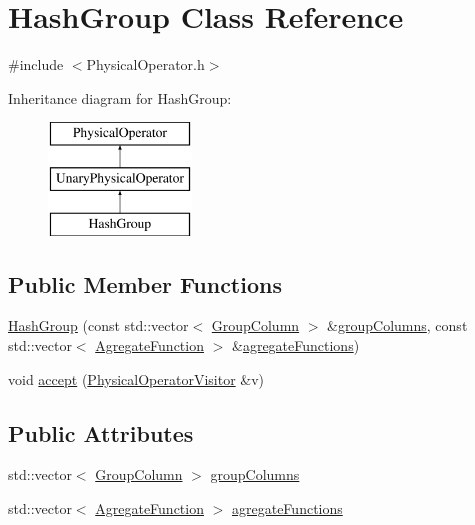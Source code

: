 \hypertarget{class_hash_group}{\section{Hash\+Group Class Reference}
\label{class_hash_group}
}


{\ttfamily \#include $<$Physical\+Operator.\+h$>$}

Inheritance diagram for Hash\+Group\+:\begin{figure}[H]
\begin{center}
\leavevmode
\includegraphics[height=3.000000cm]{class_hash_group}
\end{center}
\end{figure}
\subsection*{Public Member Functions}
\begin{DoxyCompactItemize}
\item 
\hyperlink{class_hash_group_af175f06e72f0fd7476e652ec5ffcbeb7}{Hash\+Group} (const std\+::vector$<$ \hyperlink{class_group_column}{Group\+Column} $>$ \&\hyperlink{class_hash_group_a61af9515cad55af148210493431c5df6}{group\+Columns}, const std\+::vector$<$ \hyperlink{class_agregate_function}{Agregate\+Function} $>$ \&\hyperlink{class_hash_group_a8a813f6713413f2bd401bfa77be774de}{agregate\+Functions})
\item 
void \hyperlink{class_hash_group_a300c7ad6b7a4e39c9a7dc5a57389b85f}{accept} (\hyperlink{class_physical_operator_visitor}{Physical\+Operator\+Visitor} \&v)
\end{DoxyCompactItemize}
\subsection*{Public Attributes}
\begin{DoxyCompactItemize}
\item 
std\+::vector$<$ \hyperlink{class_group_column}{Group\+Column} $>$ \hyperlink{class_hash_group_a61af9515cad55af148210493431c5df6}{group\+Columns}
\item 
std\+::vector$<$ \hyperlink{class_agregate_function}{Agregate\+Function} $>$ \hyperlink{class_hash_group_a8a813f6713413f2bd401bfa77be774de}{agregate\+Functions}
\end{DoxyCompactItemize}


